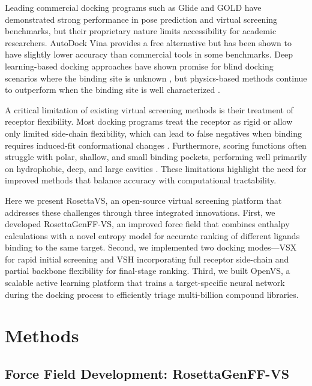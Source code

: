 \documentclass[12pt]{article}
\begin{document}
Leading commercial docking programs such as Glide \citep{friesner2004} and GOLD \citep{jones1997} have demonstrated strong performance in pose prediction and virtual screening benchmarks, but their proprietary nature limits accessibility for academic researchers. AutoDock Vina \citep{trott2010} provides a free alternative but has been shown to have slightly lower accuracy than commercial tools in some benchmarks. Deep learning-based docking approaches have shown promise for blind docking scenarios where the binding site is unknown \citep{corso2023, stärk2022}, but physics-based methods continue to outperform when the binding site is well characterized \citep{buttenschoen2024}.

A critical limitation of existing virtual screening methods is their treatment of receptor flexibility. Most docking programs treat the receptor as rigid or allow only limited side-chain flexibility, which can lead to false negatives when binding requires induced-fit conformational changes \citep{sherman2006}. Furthermore, scoring functions often struggle with polar, shallow, and small binding pockets, performing well primarily on hydrophobic, deep, and large cavities \citep{wang2015}. These limitations highlight the need for improved methods that balance accuracy with computational tractability.

Here we present RosettaVS, an open-source virtual screening platform that addresses these challenges through three integrated innovations. First, we developed RosettaGenFF-VS, an improved force field that combines enthalpy calculations with a novel entropy model for accurate ranking of different ligands binding to the same target. Second, we implemented two docking modes---VSX for rapid initial screening and VSH incorporating full receptor side-chain and partial backbone flexibility for final-stage ranking. Third, we built OpenVS, a scalable active learning platform that trains a target-specific neural network during the docking process to efficiently triage multi-billion compound libraries.

\section{Methods}

\subsection{Force Field Development: RosettaGenFF-VS}
\end{document}
